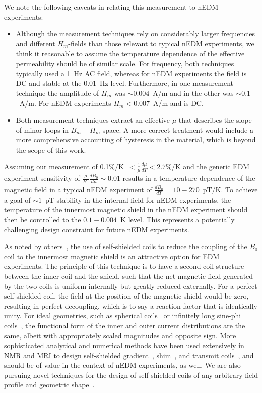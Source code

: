 \documentclass[review,number,sort&compress]{elsarticle}
\begin{document}
We note the following caveats in relating this measurement to nEDM
experiments:
\begin{itemize}
\item Although the measurement techniques rely on considerably larger
  frequencies and different $H_m$-fields than those relevant to
  typical nEDM experiments, we think it reasonable to assume the
  temperature dependence of the effective permeability should be of
  similar scale.  For frequency, both techniques typically used a 1~Hz
  AC field, whereas for nEDM experiments the field is DC and stable at
  the 0.01~Hz level.  Furthermore, in one measurement technique the
  amplitude of $H_m$ was $\sim 0.004$~A/m and in the other was $\sim
  0.1$~A/m.  For nEDM experiments $H_m<0.007$~A/m and is DC.
\item Both measurement techniques extract an effective $\mu$ that
  describes the slope of minor loops in $B_m-H_m$ space.  A more
  correct treatment would include a more comprehensive accounting of
  hysteresis in the material, which is beyond the scope of this work.
\end{itemize}

Assuming our measurement of
0.1\%/K~$<\frac{1}{\mu}\frac{d\mu}{dT}<2.7$\%/K and the generic EDM
experiment sensitivity of $\frac{\mu}{B_0}\frac{dB_0}{d\mu}\sim 0.01$
results in a temperature dependence of the magnetic field in a typical
nEDM experiment of $\frac{dB_0}{dT}=10-270$~pT/K.  To achieve a goal
of $\sim 1$~pT stability in the internal field for nEDM experiments,
the temperature of the innermost magnetic shield in the nEDM
experiment should then be controlled to the $0.1-0.004$~K level.  This
represents a potentially challenging design constraint for future nEDM
experiments.




As noted by others~\cite{bib:cpviolwithoutstrangeness}, the use of
self-shielded coils to reduce the coupling of the $B_0$ coil to the
innermost magnetic shield is an attractive option for EDM experiments.
The principle of this technique is to have a second coil structure
between the inner coil and the shield, such that the net magnetic
field generated by the two coils is uniform internally but greatly
reduced externally.  For a perfect self-shielded coil, the field at
the position of the magnetic shield would be zero, resulting in
perfect decoupling, which is to say a reaction factor that is
identically unity.  For ideal geometries, such as spherical
coils~\cite{bib:brown, bib:wheeler,bib:purcell} or infinitely long
sine-phi coils~\cite{bib:bethBNL,bib:bethUSpatent,bib:bidinosti}, the
functional form of the inner and outer current distributions are the
same, albeit with appropriately scaled magnitudes and opposite sign.
More sophisticated analytical and numerical methods have been used
extensively in NMR and MRI to design self-shielded
gradient~\cite{bib:turner,bib:hidalgo},
shim~\cite{bib:brideson,bib:forbes}, and transmit
coils~\cite{bib:bidinosti,bib:kuzmin}, and should be of value in the
context of nEDM experiments, as well.  We are also pursuing novel
techniques for the design of self-shielded coils of any arbitrary
field profile and geometric shape~\cite{bib:crawford}.
\end{document}
